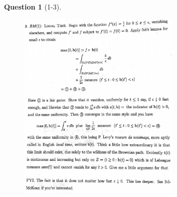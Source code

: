 \documentclass[11pt]{article}
\theoremstyle{plain}
\theoremstyle{quest}
\newtheorem*{question}{Question}
\begin{document}
\newpage

\begin{question}[1-3]
\hfill
\begin{figure}[h!]
  \centering
    \includegraphics[width=0.7\textwidth]{limthm2-f-p3.png}
\end{figure}
\end{question}
\end{document}
